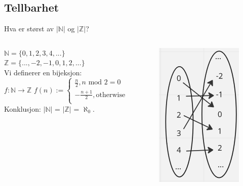 \subsection{Tellbarhet}
\begin{frame}{Hva er størst av $|\mathbb{N}|$ og $|\mathbb{Z}|$?}
    \begin{columns}
    \begin{column}{0.35\textwidth}
        $\mathbb{N} = \{0, 1, 2, 3, 4, ...\}$\\
        $\mathbb{Z} = \{..., -2, -1, 0, 1, 2, ...\}$\\[5mm]
        \pause
        Vi definerer en bijeksjon:\\ 
        $f : \mathbb{N} \rightarrow \mathbb{Z}$
        $f(n) :=
        \begin{cases}
            \frac{n}{2}, n \text{ mod } 2 = 0\\
            -\frac{n+1}{2}, \text{otherwise}\\
        \end{cases}$\\[5mm]
        \pause
        Konklusjon: $|\mathbb{N}|$ = $|\mathbb{Z}|$ = $\aleph_0$. 
    \end{column}
    \begin{column}{0.6\textwidth}
        \begin{figure}
            \includegraphics[scale=0.75]{images/n eq eq z.png}
        \end{figure}
    \end{column}
    \end{columns}    
\end{frame}

